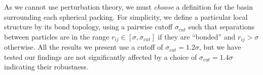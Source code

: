 \documentclass[11pt,twoside]{report}
\begin{document}
As we cannot use perturbation theory, we must \emph{choose} a definition for the basin surrounding each spherical packing.
For simplicity, we define a particular local structure by its bond topology, using a pairwise cutoff $\sigma_{cut}$ such that separations between particles are in the range $r_{ij} \in [\sigma, \sigma_{cut}]$ if they are ``bonded'' and $r_{ij} > \sigma$ otherwise.
All the results we present use a cutoff of $\sigma_{cut}=1.2 \sigma$, but we have tested our findings are not significantly affected by a choice of $\sigma_{cut}=1.4 \sigma$ indicating their robustness.


\end{document}
